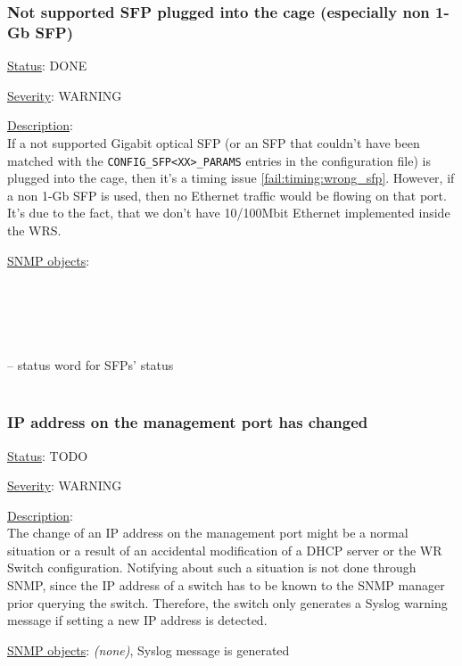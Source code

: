 \subsubsection{\bf Not supported SFP plugged into the cage (especially non 1-Gb SFP)}
		\label{fail:other:sfp}
		\begin{pck_descr}
			\item [] \underline{Status}: DONE
			\item [] \underline{Severity}: WARNING
			\item [] \underline{Description}:\\
        If a not supported Gigabit optical SFP (or an SFP that couldn't have
        been matched with the \texttt{CONFIG\_SFP<XX>\_PARAMS} entries in the
        configuration file) is plugged into the cage, then it's a timing issue
        \ref{fail:timing:wrong_sfp}. However, if a non 1-Gb
				SFP is used, then no Ethernet traffic would be flowing on that port.
				It's due to the fact, that we don't have 10/100Mbit Ethernet implemented
				inside the WRS.
			\item [] \underline{SNMP objects}:\\
        {\footnotesize
				\\
				\\
				\\
				\\
				\\
				 -- status word for SFPs' status\\
				\\
         }
		\end{pck_descr}

\subsubsection{\bf IP address on the management port has changed}
		\begin{pck_descr}
			\item [] \underline{Status}: TODO
			\item [] \underline{Severity}: WARNING
			\item [] \underline{Description}:\\
        The change of an IP address on the management port might be a normal
        situation or a result of an accidental modification of a DHCP server or
        the WR Switch configuration. Notifying about such a situation is not
        done through SNMP, since the IP address of a switch has to be known to
        the SNMP manager prior querying the switch. Therefore, the switch only
        generates a Syslog warning message if setting a new IP address is
        detected.
      \item [] \underline{SNMP objects}: \emph{(none)}, Syslog message is
        generated
		\end{pck_descr}

